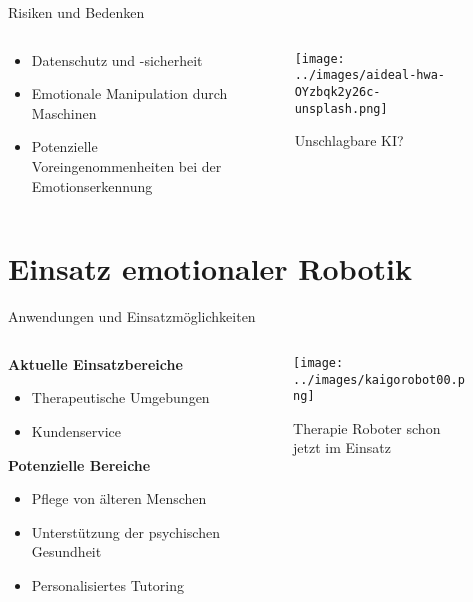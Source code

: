 \documentclass[aspectratio=169]{beamer}
\begin{document}
\begin{frame}{Risiken und Bedenken}
  \begin{columns}
    \begin{column}{0.6\textwidth}
      \begin{itemize}
        \item Datenschutz und -sicherheit
        \item Emotionale Manipulation durch Maschinen
        \item Potenzielle Voreingenommenheiten bei der Emotionserkennung
      \end{itemize}
    \end{column}
    \begin{column}{0.4\textwidth}
      \begin{figure}[h]
        \centering
        \texttt{[image: ../images/aideal-hwa-OYzbqk2y26c-unsplash.png]}
        \caption{Unschlagbare KI?}
      \end{figure}
    \end{column}
  \end{columns}
\end{frame}

\section{Einsatz emotionaler Robotik}
\begin{frame}{Anwendungen und Einsatzmöglichkeiten}
  \begin{columns}
    \begin{column}{0.6\textwidth}
      \textbf{Aktuelle Einsatzbereiche}
      \begin{itemize}
        \item Therapeutische Umgebungen
        \item Kundenservice
      \end{itemize}
      \vspace{1cm}

      \textbf{Potenzielle Bereiche}
      \begin{itemize}
        \item Pflege von älteren Menschen
        \item Unterstützung der psychischen Gesundheit
        \item Personalisiertes Tutoring
      \end{itemize}
    \end{column}
    \begin{column}{0.4\textwidth}
      \begin{figure}[h]
        \centering
        \texttt{[image: ../images/kaigorobot00.png]}
        \caption{Therapie Roboter schon jetzt im Einsatz}
      \end{figure}
    \end{column}
  \end{columns}
\end{frame}
\end{document}
